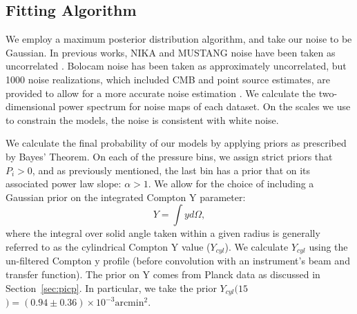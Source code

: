 \documentclass[twocolumn,traditabstract]{aa}
\begin{document}

\subsection{Fitting Algorithm}
\label{sec:fitting}

We employ a maximum posterior distribution algorithm, and take our noise to be Gaussian.
In previous works, NIKA and MUSTANG noise have been taken as uncorrelated \citep[e.g.][]{romero2015a,romero2017,adam2015}.
Bolocam noise has been taken as approximately uncorrelated, but 1000 noise realizations, which included CMB and point
source estimates, are provided to allow for a more accurate noise estimation \citep{sayers2011}.
We calculate the two-dimensional power spectrum for noise maps of each dataset. On the scales we use to constrain the models,
the noise is consistent with white noise.

We calculate the final probability of our models by applying priors as prescribed by Bayes' Theorem.
On each of the pressure bins, we assign strict priors that $P_i > 0$, and as previously mentioned, the last bin
has a prior that on its associated power law slope: $\alpha > 1$. We allow for the choice of including a Gaussian
prior on the integrated Compton Y parameter:
\begin{equation}
  Y = \int y d\Omega,
  \label{eqn:integrated_y}
\end{equation}
where the integral over solid angle taken within a given radius is generally referred to as the cylindrical
Compton Y value ($Y_{cyl}$). We calculate $Y_{cyl}$ using the un-filtered Compton y profile (before convolution with
an instrument's beam and transfer function). The prior on Y comes
from Planck data \citep{planck2014} as discussed in Section~\ref{sec:picp}.
In particular, we take the prior $Y_{cyl}(15$\amin$) = (0.94 \pm 0.36) \times 10^{-3} \text{arcmin}^2$.
\end{document}
